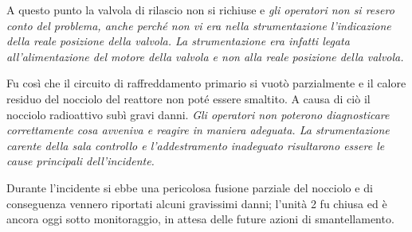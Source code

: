 A questo punto la valvola di rilascio non si richiuse e \emph{gli operatori non si resero conto del problema, anche perché non vi era
nella strumentazione l'indicazione della reale posizione della valvola. La strumentazione era infatti legata all'alimentazione del
motore della valvola e non alla reale posizione della valvola.}

Fu così che il circuito di raffreddamento primario si vuotò parzialmente e il calore residuo del nocciolo del reattore non poté
essere smaltito. A causa di ciò il nocciolo radioattivo subì gravi danni. \emph{Gli operatori non poterono diagnosticare correttamente
cosa avveniva e reagire in maniera adeguata. La strumentazione carente della sala controllo e l'addestramento inadeguato risultarono
essere le cause principali dell'incidente.}

Durante l'incidente si ebbe una pericolosa fusione parziale del nocciolo e di conseguenza vennero riportati alcuni gravissimi danni;
l'unità 2 fu chiusa ed è ancora oggi sotto monitoraggio, in attesa delle future azioni di smantellamento.

